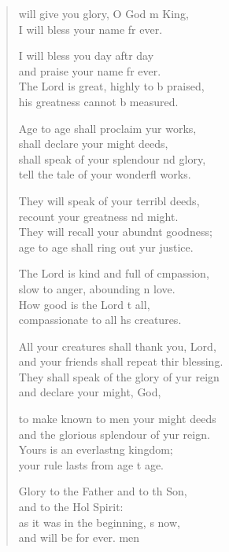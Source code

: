 \settowidth{\versewidth}{All your creatures shall thank you, O Lord, *}
\begin{verse}%
  \begin{patverse}
 will give you glory, O God m King, \Med\\
I will bless your name fr ever.

I will bless you day aftr day\Med\\
and praise your name fr ever.\\
The Lord is great, highly to b praised,\Med\\
his greatness cannot b measured.

Age to age shall proclaim yur works,\Med\\
shall declare your might deeds,\\
shall speak of your splendour nd glory,\Med\\
tell the tale of your wonderfl works.

They will speak of your terribl deeds,\Med\\
recount your greatness nd might.\\
They will recall your abundnt goodness;\Med\\
age to age shall ring out yur justice.

The Lord is kind and full of cmpassion,\Med\\
slow to anger, abounding \pointup{\i}n love.\\
How good is the Lord t all,\Med\\
compassionate to all h\pointup{\i}s creatures.

All your creatures shall thank you,  Lord,\Med\\
and your friends shall repeat thir blessing.\\
They shall speak of the glory of yur reign\Med\\
and declare your might,  God,

to make known to men your might deeds\Med\\
and the glorious splendour of yur reign.\\
Yours is an everlast\pointup{\i}ng kingdom;\Med\\
your rule lasts from age t age.

Glory to the Father and to th Son,\Med\\
and to the Hol Spirit:\\
as it was in the beginning, \pointup{\i}s now,\Med\\
and will be for ever. men
  \end{patverse}
\end{verse}
